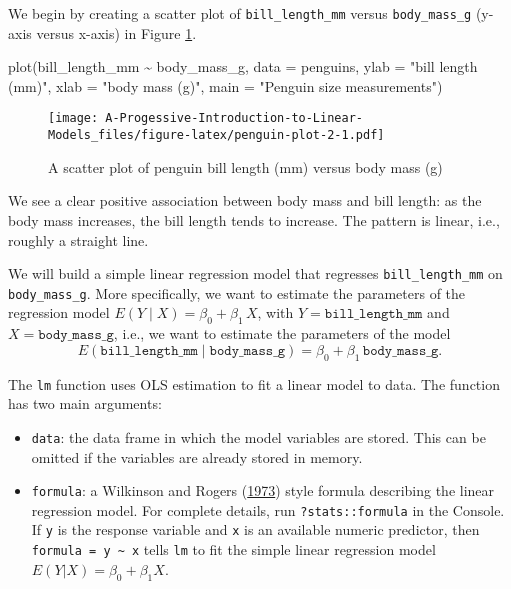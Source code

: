 \documentclass[
]{book}
\newenvironment{Shaded}{\begin{snugshade}}{\end{snugshade}}
\newcommand{\AttributeTok}[1]{\textcolor[rgb]{0.77,0.63,0.00}{#1}}
\newcommand{\FunctionTok}[1]{\textcolor[rgb]{0.00,0.00,0.00}{#1}}
\newcommand{\NormalTok}[1]{#1}
\newcommand{\SpecialCharTok}[1]{\textcolor[rgb]{0.00,0.00,0.00}{#1}}
\newcommand{\StringTok}[1]{\textcolor[rgb]{0.31,0.60,0.02}{#1}}
\providecommand{\tightlist}{%
  \setlength{\itemsep}{0pt}\setlength{\parskip}{0pt}}
\theoremstyle{definition}
\theoremstyle{definition}
\theoremstyle{definition}
\theoremstyle{definition}
\theoremstyle{remark}
\begin{document}
We begin by creating a scatter plot of \texttt{bill\_length\_mm} versus \texttt{body\_mass\_g} (y-axis versus x-axis) in Figure \ref{fig:penguin-plot-2}.

\begin{Shaded}
\begin{Highlighting}[]
\FunctionTok{plot}\NormalTok{(bill\_length\_mm }\SpecialCharTok{\textasciitilde{}}\NormalTok{ body\_mass\_g, }\AttributeTok{data =}\NormalTok{ penguins,}
     \AttributeTok{ylab =} \StringTok{"bill length (mm)"}\NormalTok{, }\AttributeTok{xlab =} \StringTok{"body mass (g)"}\NormalTok{,}
     \AttributeTok{main =} \StringTok{"Penguin size measurements"}\NormalTok{)}
\end{Highlighting}
\end{Shaded}

\begin{figure}
\centering
\texttt{[image: A-Progessive-Introduction-to-Linear-Models\_files/figure-latex/penguin-plot-2-1.pdf]}
\caption{\label{fig:penguin-plot-2}A scatter plot of penguin bill length (mm) versus body mass (g)}
\end{figure}

We see a clear positive association between body mass and bill length: as the body mass increases, the bill length tends to increase. The pattern is linear, i.e., roughly a straight line.

We will build a simple linear regression model that regresses \texttt{bill\_length\_mm} on \texttt{body\_mass\_g}. More specifically, we want to estimate the parameters of the regression model \(E(Y\mid X)=\beta_0+\beta_1\,X\), with \(Y=\mathtt{bill\_length\_mm}\) and \(X=\mathtt{body\_mass\_g}\), i.e., we want to estimate the parameters of the model
\[
E(\mathtt{bill\_length\_mm}\mid \mathtt{body\_mass\_g})=\beta_0+\beta_1\,\mathtt{body\_mass\_g}.
\]

The \texttt{lm} function uses OLS estimation to fit a linear model to data. The function has two main arguments:

\begin{itemize}
\tightlist
\item
  \texttt{data}: the data frame in which the model variables are stored. This can be omitted if the variables are already stored in memory.
\item
  \texttt{formula}: a Wilkinson and Rogers (\protect\hyperlink{ref-wilkinsonrogers1973}{1973}) style formula describing the linear regression model. For complete details, run \texttt{?stats::formula} in the Console. If \texttt{y} is the response variable and \texttt{x} is an available numeric predictor, then \texttt{formula\ =\ y\ \textasciitilde{}\ x} tells \texttt{lm} to fit the simple linear regression model \(E(Y|X)=\beta_0+\beta_1 X\).
\end{itemize}
\end{document}
